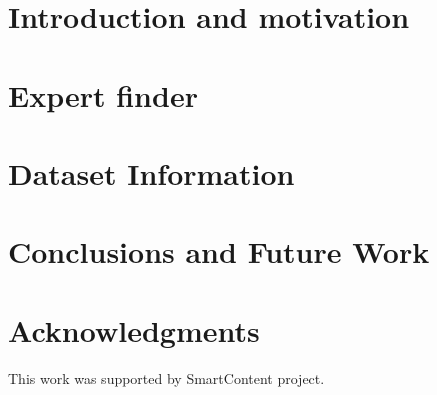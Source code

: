 \documentclass{llncs}
\begin{document}
\section{Introduction and motivation}\label{sec:Introduction}


%

\section{Expert finder}\label{sec:Motivation}


\section{Dataset Information}\label{sec:DataInfo}


%


\section{Conclusions and Future Work}\label{sec:Conclusions}





\section*{Acknowledgments}

This work was supported by SmartContent project.



%






\clearpage
{} %
\renewcommand{\indexname}{Author Index}
\printindex \clearpage
{} %
\renewcommand{\indexname}{Subject Index}
%
\end{document}

